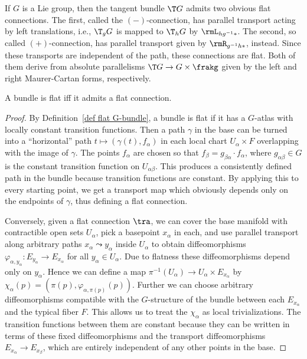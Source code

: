 \begin{example}\label{ex flat connections on G}
    If $G$ is a Lie group, then the tangent bundle $\T G$ admits two obvious flat connections. The first, called the $(-)$-connection, has parallel transport acting by left translations, i.e., $\T_g G$ is mapped to $\T_h G$ by $\rmL_{hg^{-1}\ast}$. The second, so called $(+)$-connection, has parallel transport given by $\rmR_{g^{-1}h\ast}$, instead. Since these transports are independent of the path, these connections are flat. Both of them derive from absolute parallelisms $\T G\to G\times\frakg$ given by the left and right Maurer-Cartan forms, respectively.
\end{example}



\begin{prop}
    A bundle is flat iff it admits a flat connection.
\end{prop}
\begin{proof}
    By Definition~\ref{def flat G-bundle}, a bundle is flat if it  has a $G$-atlas with locally constant transition functions. Then a path $\gamma$ in the base can be turned into a ``horizontal'' path $t\mapsto (\gamma(t),f_\alpha)$ in each local chart $U_\alpha\times F$ overlapping with the image of $\gamma$. The points $f_\alpha$ are chosen so that $f_\beta=g_{\beta\alpha}\cdot f_\alpha$, where $g_{\alpha\beta}\in G$ is the constant transition function on $U_{\alpha\beta}$. This produces a consistently defined path in the bundle because transition functions are constant. By applying this to every starting point, we get a transport map which obviously depends only on the endpoints of $\gamma$, thus defining a flat connection.

    Conversely, given a flat connection $\tra$, we can cover the base manifold with contractible open sets $U_\alpha$, pick a basepoint $x_\alpha$ in each, and use parallel transport along arbitrary paths $x_\alpha\leadsto y_\alpha$ inside $U_\alpha$ to obtain diffeomorphisms $\varphi_{\alpha,y_\alpha}:E_{y_\alpha}\to E_{x_\alpha}$ for all $y_\alpha\in U_\alpha$. Due to flatness these diffeomorphisms depend only on $y_\alpha$. Hence we can define a map $\pi^{-1}(U_\alpha)\to U_\alpha\times E_{x_\alpha}$ by $\chi_\alpha(p)=(\pi(p),\varphi_{\alpha,\pi(p)}(p))$. Further we can choose arbitrary diffeomorphisms compatible with the $G$-structure of the bundle between each $E_{x_\alpha}$ and the typical fiber $F$. This allows us to treat the $\chi_\alpha$ as local trivializations. The transition functions between them are constant because they can be written in terms of these fixed diffeomorphisms and the transport diffeomorphisms $E_{x_\alpha}\to E_{x_\beta}$, which are entirely independent of any other points in the base.
\end{proof}

